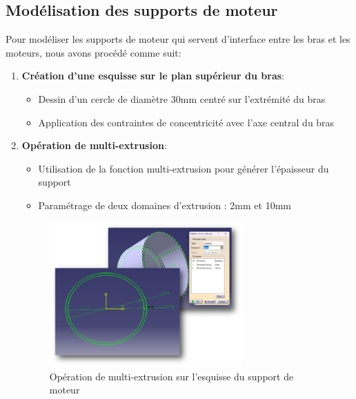 \documentclass[a4paper,12pt]{report}
\begin{document}
\subsection{Modélisation des supports de moteur}
Pour modéliser les supports de moteur qui servent d'interface entre les bras et les moteurs, nous avons procédé comme suit:
\begin{enumerate}
    \item \textbf{Création d'une esquisse sur le plan supérieur du bras}:
    \begin{itemize}
        \item Dessin d'un cercle de diamètre 30mm centré sur l'extrémité du bras
        \item Application des contraintes de concentricité avec l'axe central du bras
    \end{itemize}
    \item \textbf{Opération de multi-extrusion}:
    \begin{itemize}
        \item Utilisation de la fonction multi-extrusion pour générer l'épaisseur du support
        \item Paramétrage de deux domaines d'extrusion : 2mm et 10mm
    \end{itemize}
    \begin{figure}[H]
        \centering
        \includegraphics[width=0.7\textwidth]{images/multi_extrusion_tube.png}
        \caption{Opération de multi-extrusion sur l'esquisse du support de moteur}
        \label{fig:multi_extrusion_tube}
    \end{figure}
    

\end{enumerate}
\end{document}
